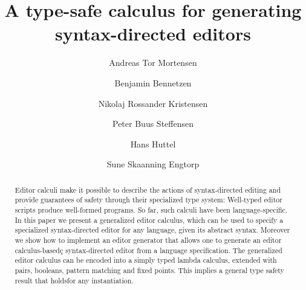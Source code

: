 \documentclass[sigplan,review]{acmart}
\begin{document}
\title{A type-safe calculus for generating
  syntax-directed editors}



\author{Andreas Tor Mortensen}


\author{Benjamin Bennetzen}


\author{Nikolaj Rossander Kristensen}

\author{Peter Buus Steffensen}
\authornotemark[1]


\author{Hans Huttel}
\author{Sune Skaanning Engtorp}
\authornotemark[2]



\renewcommand{\shortauthors}{Bennetzen et al.}

\begin{abstract}
  
  Editor calculi make it possible to describe the actions of
  syntax-directed editing and provide guarantees of safety through
  their specialized type system: Well-typed editor scripts produce
  well-formed programs. So far, such calculi have been
  language-specific. In this paper we present a generalized editor
  calculus, which can be used to specify a specialized syntax-directed
  editor for any language, given its abstract syntax. Moreover we show
  how to implement an editor generator that allows one to generate an
  editor calculus-basedç syntax-directed editor from a language
  specification. The generalized editor calculus can be encoded into a
  simply typed lambda calculus, extended with pairs, booleans, pattern
  matching and fixed points. This implies a general type safety result
  that holdsfor any instantiation.
  
\end{abstract}
\end{document}
